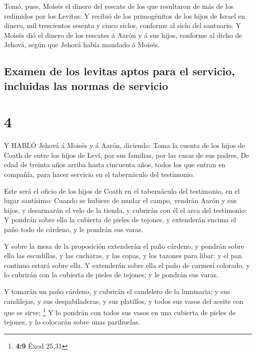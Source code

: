  Tomó, pues, Moisés el dinero del rescate de los que
resultaron de más de los redimidos por los Levitas:  Y
recibió de los primogénitos de los hijos de Israel en dinero, mil
trescientos sesenta y cinco siclos, conforme al siclo del santuario.
 Y Moisés dió el dinero de los rescates á Aarón y á sus
hijos, conforme al dicho de Jehová, según que Jehová había mandado á
Moisés.

\hypertarget{examen-de-los-levitas-aptos-para-el-servicio-incluidas-las-normas-de-servicio}{%
\subsection{Examen de los levitas aptos para el servicio, incluidas las
normas de
servicio}\label{examen-de-los-levitas-aptos-para-el-servicio-incluidas-las-normas-de-servicio}}

\hypertarget{section-3}{%
\section{4}\label{section-3}}

 Y HABLÓ Jehová á Moisés y á Aarón, diciendo: 
Toma la cuenta de los hijos de Coath de entre los hijos de Leví, por sus
familias, por las casas de sus padres,  De edad de treinta
años arriba hasta cincuenta años, todos los que entran en compañía, para
hacer servicio en el tabernáculo del testimonio.

 Este será el oficio de los hijos de Coath en el tabernáculo
del testimonio, en el lugar santísimo:  Cuando se hubiere de
mudar el campo, vendrán Aarón y sus hijos, y desarmarán el velo de la
tienda, y cubrirán con él el arca del testimonio:  Y pondrán
sobre ella la cubierta de pieles de tejones, y extenderán encima el paño
todo de cárdeno, y le pondrán sus varas.

 Y sobre la mesa de la proposición extenderán el paño
cárdeno, y pondrán sobre ella las escudillas, y las cucharas, y las
copas, y los tazones para libar: y el pan continuo estará sobre ella.
 Y extenderán sobre ella el paño de carmesí colorado, y lo
cubrirán con la cubierta de pieles de tejones; y le pondrán sus varas.

 Y tomarán un paño cárdeno, y cubrirán el candelero de la
luminaria; y sus candilejas, y sus despabiladeras, y sus platillos, y
todos sus vasos del aceite con que se sirve; \footnote{\textbf{4:9} Éxod
  25,31}  Y lo pondrán con todos sus vasos en una cubierta
de pieles de tejones, y lo colocarán sobre unas parihuelas.

